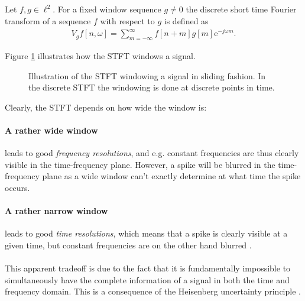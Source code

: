 \begin{definition}\label{def:stft_discrete}
Let $f,g\in\ell^2$. For a fixed window sequence $g\neq0$ the discrete short time Fourier transform of a sequence $f$ with respect to $g$ is defined as
\begin{align}
V_gf[n,\omega]=\sum_{m=-\infty}^{\infty}f[n+m]g[m]\mathrm{e}^{-j\omega m}.
\end{align}
\end{definition}
Figure \ref{fig:sliding_stft} illustrates how the STFT windows a signal.
\begin{figure}[H]
\centering
{}
\caption{Illustration of the STFT windowing a signal in sliding fashion. In the discrete STFT the windowing is done at discrete points in time.}
\label{fig:sliding_stft}
\end{figure}
Clearly, the STFT depends on how wide the window is:
\paragraph{A rather wide window} leads to good \textit{frequency resolutions}, and e.g. constant frequencies are thus clearly visible in the time-frequency plane. However, a spike will be blurred in the time-frequency plane as a wide window can't exactly determine at what time the spike occurs.
\paragraph{A rather narrow window} leads to good \textit{time resolutions}, which means that a spike is clearly visible at a given time, but constant frequencies are on the other hand blurred \cite{Davis}. \\ \\
This apparent tradeoff is due to the fact that it is fundamentally impossible to simultaneously have the complete information of a signal in both the time and frequency domain. This is a consequence of the Heisenberg uncertainty principle \cite{page 409, Wang}.

